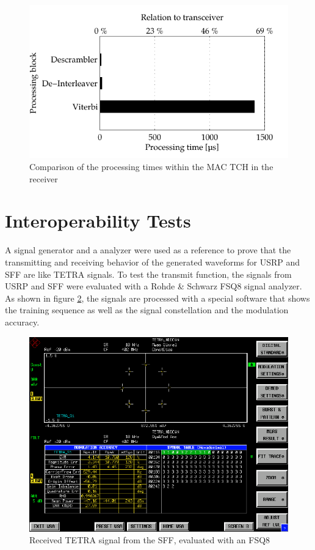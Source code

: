 \begin{figure}[h!!]
	\centering
		\includegraphics{../kapitel05/figures/bench_dsp_rx_tch.pdf}
	\caption{Comparison of the processing times within the MAC TCH in the receiver}
	\label{fig:bench_dsp_rx_tch}
\end{figure}

\section{Interoperability Tests}

A signal generator and a analyzer were used as a reference to prove that the transmitting and receiving behavior of the generated waveforms for USRP and SFF are like TETRA signals. To test the transmit function, the signals from USRP and SFF were evaluated with a Rohde \& Schwarz FSQ8 signal analyzer. As shown in figure \ref{fig:screenshot_tetra_01}, the signals are processed with a special software that shows the training sequence as well as the signal constellation and the modulation accuracy.

\begin{figure}[htb]
	\centering
		\includegraphics[width=1.00\textwidth]{../kapitel05/figures/screenshot_tetra_01.pdf}
		\caption{Received TETRA signal from the SFF, evaluated with an FSQ8}
	\label{fig:screenshot_tetra_01}
\end{figure}


